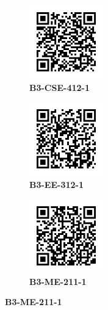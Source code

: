 \documentclass{article}
\begin{document}
	\clearpage
	\begin{figure}[]
		\centering
		\begin{subfigure}{0.19\textwidth}
			\centering
			\includegraphics[width = 3.2cm,height = 3.2cm]{B3-CSE-412-1}
			\caption*{\large{\textbf{B3-CSE-412-1}}}
		\end{subfigure}\hfil
		\begin{subfigure}{0.19\textwidth}
			\centering
			\includegraphics[width = 3.2cm,height = 3.2cm]{B3-EE-312-1}
			\caption*{\large{\textbf{B3-EE-312-1}}}
		\end{subfigure}\hfil
		\begin{subfigure}{0.19\textwidth}
			\centering
			\includegraphics[width = 3.2cm,height = 3.2cm]{B3-ME-211-1}
			\caption*{\large{\textbf{B3-ME-211-1}}}
		\end{subfigure}\hfil
	\end{figure}
\end{document}
